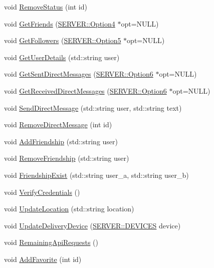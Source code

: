 \begin{CompactItemize}
\item 
void \hyperlink{classTwitLib_2a44ccbe158bcd126a5411f7644120b3}{RemoveStatus} (int id)
\item 
void \hyperlink{classTwitLib_27dd0d45500cb4cd8f32a92a255eba8d}{GetFriends} (\hyperlink{structSERVER_1_1Option4}{SERVER::Option4} $\ast$opt=NULL)
\item 
void \hyperlink{classTwitLib_5a49752d1e872fe3cf8a5c055b5c2f9a}{GetFollowers} (\hyperlink{structSERVER_1_1Option5}{SERVER::Option5} $\ast$opt=NULL)
\item 
void \hyperlink{classTwitLib_87f38173a3602ee392350b17977c99fe}{GetUserDetails} (std::string user)
\item 
void \hyperlink{classTwitLib_23f41783466fe193e6d2394475d9e282}{GetSentDirectMessages} (\hyperlink{structSERVER_1_1Option6}{SERVER::Option6} $\ast$opt=NULL)
\item 
void \hyperlink{classTwitLib_6a98347a2c1e93dff60543a6a45da4b3}{GetReceivedDirectMessages} (\hyperlink{structSERVER_1_1Option6}{SERVER::Option6} $\ast$opt=NULL)
\item 
void \hyperlink{classTwitLib_3a02fb42122cdbb9ebc1c16aed7c2c66}{SendDirectMessage} (std::string user, std::string text)
\item 
void \hyperlink{classTwitLib_8e443d79afbb1dc30cb0616c8bfb9ab8}{RemoveDirectMessage} (int id)
\item 
void \hyperlink{classTwitLib_0ce624472fe8b48f7cfbf0a5740b722a}{AddFriendship} (std::string user)
\item 
void \hyperlink{classTwitLib_28e61df6e7bf8614ba93ab612a72d7d9}{RemoveFriendship} (std::string user)
\item 
void \hyperlink{classTwitLib_31f1bc4db7624b5e9a6eeffc648778c5}{FriendshipExist} (std::string user\_\-a, std::string user\_\-b)
\item 
void \hyperlink{classTwitLib_50ebe7525d2f6acb9ecd9a9217265c79}{VerifyCredentials} ()
\item 
void \hyperlink{classTwitLib_b133510fb4b88bd568a404e8271c7df4}{UpdateLocation} (std::string location)
\item 
void \hyperlink{classTwitLib_b8fe352f9dc64231eddfaa86cfc473f9}{UpdateDeliveryDevice} (\hyperlink{namespaceSERVER_354160f0b752453a760c63ec882c8c87}{SERVER::DEVICES} device)
\item 
void \hyperlink{classTwitLib_0a56abd6d94a6bccf0d761e7359c41ba}{RemainingApiRequests} ()
\item 
void \hyperlink{classTwitLib_d3caf78e988a99cdcc8ef8115afbc517}{AddFavorite} (int id)

\end{CompactItemize}
